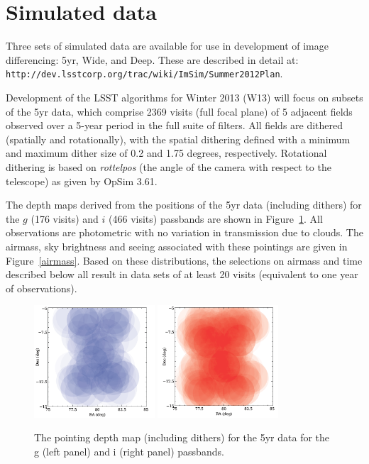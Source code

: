 \documentclass[prd, nofootinbib, floatfix, 11pt,tightenlines,times]{article}
\begin{document}
\clearpage 

\section{Simulated data} 

Three sets of simulated data are available for use in development of
image differencing: 5yr, Wide, and Deep. These are described in detail
at:  {\tt http://dev.lsstcorp.org/trac/wiki/ImSim/Summer2012Plan}.

Development of the LSST algorithms for Winter 2013 (W13) will focus on
subsets of the 5yr data, which comprise 2369 visits (full focal plane)
of 5 adjacent fields observed over a 5-year period in the full suite
of filters. All fields are dithered (spatially and rotationally), with the
spatial dithering defined with a minimum and maximum dither size of
0.2 and 1.75 degrees, respectively. Rotational dithering is based on
{\it rottelpos} (the angle of the camera with respect to the
telescope) as given by OpSim 3.61.

The depth maps derived from the positions of the 5yr data (including
dithers) for the $g$ (176 visits) and $i$ (466 visits) passbands are
shown in Figure~\ref{depth}. All observations are photometric with no
variation in transmission due to clouds. The airmass, sky brightness
and seeing associated with these pointings are given in
Figure~\ref{airmass}. Based on these distributions, the selections on
airmass and time described below all result in data sets of at least
20 visits (equivalent to one year of observations).

\begin{figure}
\centerline{
\includegraphics[width=0.4\textwidth]{Figures/depth_g.png}\hfil
\includegraphics[width=0.4\textwidth]{Figures/depth_i.png}
}
\caption{The pointing depth map (including dithers) for the 5yr data for the g (left panel)
 and i (right panel)  passbands.}
\label{depth}
\end{figure}
\end{document}
